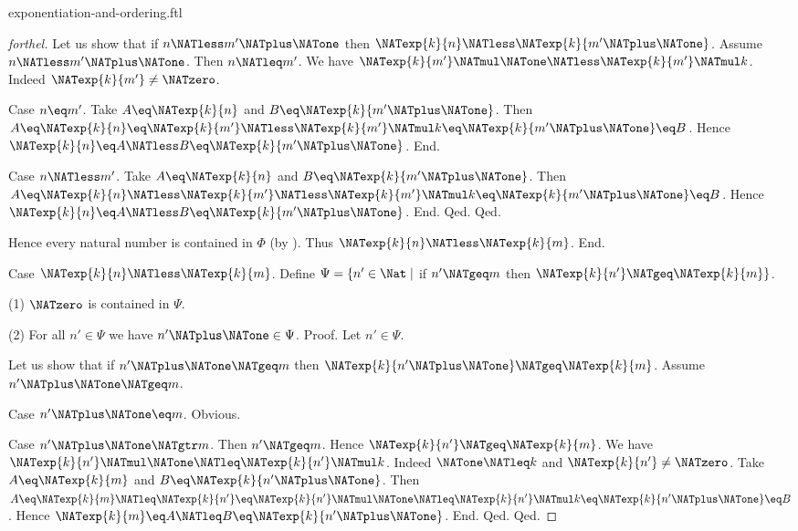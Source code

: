 \documentclass{naproche-library}
\begin{document}
\begin{smodule}[title=Exponentiation and Ordering]{exponentiation-and-ordering.ftl}
\begin{proof}[forthel]
      Let us show that if $n \NATless m' \NATplus \NATone$ then $\NATexp{k}{n} \NATless \NATexp{k}{m' \NATplus \NATone}$.
        Assume $n \NATless m' \NATplus \NATone$.
        Then $n \NATleq m'$.
        We have $\NATexp{k}{m'} \NATmul \NATone \NATless \NATexp{k}{m'} \NATmul k$.
        Indeed $\NATexp{k}{m'} \neq \NATzero$.

        Case $n \eq m'$.
          Take $A \eq \NATexp{k}{n}$ and $B \eq \NATexp{k}{m' \NATplus \NATone}$. %
          Then $A
            \eq \NATexp{k}{n}
            \eq \NATexp{k}{m'}
            \NATless \NATexp{k}{m'} \NATmul k
            \eq \NATexp{k}{m' \NATplus \NATone}
            \eq B$.
          Hence $\NATexp{k}{n} \eq A \NATless B \eq \NATexp{k}{m' \NATplus \NATone}$.
        End.

        Case $n \NATless m'$.
          Take $A \eq \NATexp{k}{n}$ and $B \eq \NATexp{k}{m' \NATplus \NATone}$. %
          Then $A
            \eq \NATexp{k}{n}
            \NATless \NATexp{k}{m'}
            \NATless \NATexp{k}{m'} \NATmul k
            \eq \NATexp{k}{m' \NATplus \NATone}
            \eq B$.
          Hence $\NATexp{k}{n} \eq A \NATless B \eq \NATexp{k}{m' \NATplus \NATone}$.
        End.
      Qed.
    Qed.

    Hence every natural number is contained in $\Phi$ (by ).
    Thus $\NATexp{k}{n} \NATless \NATexp{k}{m}$.
  End.

  Case $\NATexp{k}{n} \NATless \NATexp{k}{m}$.
    Define $\Psi = \{ n' \in \Nat \mid$ if $n' \NATgeq m$ then
    $\NATexp{k}{n'} \NATgeq \NATexp{k}{m} \}$.

    (1) $\NATzero$ is contained in $\Psi$.

    (2) For all $n' \in \Psi$ we have $n' \NATplus \NATone \in \Psi$. \newline
    Proof.
      Let $n' \in \Psi$.

      Let us show that if $n' \NATplus \NATone \NATgeq m$ then $\NATexp{k}{n' \NATplus \NATone} \NATgeq \NATexp{k}{m}$.
        Assume $n' \NATplus \NATone \NATgeq m$.

        Case $n' \NATplus \NATone \eq m$. Obvious.

        Case $n' \NATplus \NATone \NATgtr m$.
          Then $n' \NATgeq m$.
          Hence $\NATexp{k}{n'} \NATgeq \NATexp{k}{m}$.
          We have $\NATexp{k}{n'} \NATmul \NATone \NATleq \NATexp{k}{n'} \NATmul k$.
          Indeed $\NATone \NATleq k$ and $\NATexp{k}{n'} \neq \NATzero$.
          Take $A \eq \NATexp{k}{m}$ and $B \eq \NATexp{k}{n' \NATplus \NATone}$. %
          Then $A
            \eq \NATexp{k}{m}
            \NATleq \NATexp{k}{n'}
            \eq \NATexp{k}{n'} \NATmul \NATone
            \NATleq \NATexp{k}{n'} \NATmul k
            \eq \NATexp{k}{n' \NATplus \NATone}
            \eq B$.
          Hence $\NATexp{k}{m} \eq A \NATleq B \eq \NATexp{k}{n' \NATplus \NATone}$.
        End.
      Qed.
    Qed.


\end{proof}
\end{smodule}
\end{document}
